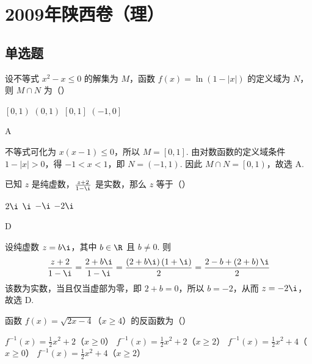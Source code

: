 \chapter{2009年陕西卷（理）}

\section{单选题}

\begin{problem}
设不等式 \(x^{2} - x \leqslant 0\) 的解集为 \(M\)，函数 \(f\left(x\right) = \ln\left(1 - |x|\right)\) 的定义域为 \(N\)，则 \(M \cap N\) 为（\quad）

\choices
    {\(\left[0, 1\right)\)}
    {\(\left(0,1\right)\)}
    {\(\left[0,1\right]\)}
    {\(\left(-1,0\right]\)}

\end{problem}

\begin{answer}
A
\end{answer}

\begin{solution}
不等式可化为 \(x\left(x-1\right)\leqslant0\)，所以 \(M=\left[0,1\right]\). 由对数函数的定义域条件
\(1-|x|>0\)，得 \(-1<x<1\)，即 \(N=\left(-1,1\right)\). 因此
\(M\cap N=\left[0,1\right)\)，故选 A.
\end{solution}

\begin{problem}
已知 \(z\) 是纯虚数，\(\frac{z + 2}{1 - \i}\) 是实数，那么 \(z\) 等于（\quad）

\choices
    {\(2\i\)}
    {\(\i\)}
    {\(-\i\)}
    {\(-2\i\)}

\end{problem}

\begin{answer}
D
\end{answer}

\begin{solution}
设纯虚数 \(z=b\i\)，其中 \(b\in\R\) 且 \(b\ne0\). 则
\[
\frac{z+2}{1-\i}=\frac{2+b\i}{1-\i}=\frac{\left(2+b\i\right)\left(1+\i\right)}{2}=\frac{2-b+\left(2+b\right)\i}{2}
\]
该数为实数，当且仅当虚部为零，即 \(2+b=0\)，所以 \(b=-2\)，从而 \(z=-2\i\)，故选 D.
\end{solution}

\begin{problem}
函数 \( f\left(x\right) = \sqrt{2x - 4} \)（\(x \geqslant 4\)）的反函数为（\quad）

\choices
    {\(f^{-1}\left(x\right) = \frac{1}{2} x^2 + 2\)（\(x\geqslant 0\)）}
    {\(f^{-1}\left(x\right) = \frac{1}{2} x^2 + 2\)（\(x\geqslant 2\)）}
    {\(f^{-1}\left(x\right) = \frac{1}{2} x^2 + 4\)（\(x\geqslant 0\)）}
    {\(f^{-1}\left(x\right) = \frac{1}{2} x^2 + 4\)（\(x\geqslant 2\)）}

\end{problem}

